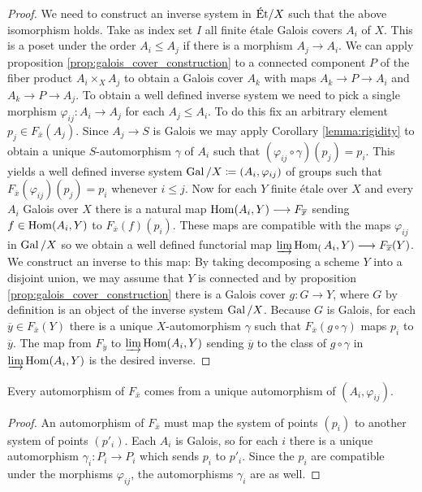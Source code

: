 \begin{proof}
	We need to construct an inverse system in $\text{\'Et}/X$ such that the above isomorphism holds. Take as index set $I$ all finite \'etale Galois covers $A_i$ of $X$. This is a poset under the order $A_i \le A_j$ if there is a morphism $A_j \to A_i$. We can apply proposition \ref{prop:galois_cover_construction} to a connected component $P$ of the fiber product $A_i \times_X A_j$ to obtain a Galois cover $A_k$ with maps $A_k \to P \to A_i$ and $A_k \to P \to A_j$. To obtain a well defined inverse system we need to pick a single morphism $\varphi_{ij} \colon A_i \to A_j$ for each $A_j \le A_i$. To do this fix an arbitrary element $p_j \in F_{\overline{x}}(A_j)$. Since $A_j \to S$ is Galois we may apply Corollary \ref{lemma:rigidity} to obtain a unique $S$-automorphism $\gamma$ of $A_i$ such that $(\varphi_{ij} \circ \gamma) (p_j) = p_i$. This yields a well defined inverse system $\operatorname{Gal}/X \coloneqq (A_i, \varphi_{ij})$ of groups such that $F_{\overline{x}}(\varphi_{ij})(p_j) = p_i$ whenever $i \le j$. Now for each $Y$ finite \'etale over $X$ and every $A_i$ Galois over $X$ there is a natural map $\operatorname{Hom}(A_i, Y) \longrightarrow F_{\overline{x}}$ sending $f \in \operatorname{Hom}(A_i,Y)$ to $F_{\overline{x}}(f)(p_i)$. These maps are compatible with the maps $\varphi_{ij}$ in $\operatorname{Gal}/X$ so we obtain a well defined functorial map $\varinjlim \operatorname{Hom}_(A_i, Y) \longrightarrow F_{\overline{x}}(Y)$. We construct an inverse to this map: By taking decomposing a scheme $Y$ into a disjoint union, we may assume that $Y$ is connected and by proposition \ref{prop:galois_cover_construction} there is a Galois cover $g: G \to Y$, where $G$ by definition is an object of the inverse system $\operatorname{Gal}/X$. Because $G$ is Galois, for each $\overline{y} \in F_{\overline{x}}(Y)$ there is a unique $X$-automorphism $\gamma$ such that $F_{\overline{x}}(g \circ \gamma)$ maps $p_i$ to $\overline{y}$. The map from $F_{\overline{y}}$ to $\varinjlim \operatorname{Hom}(A_i, Y)$ sending $\overline{y}$ to the class of $g \circ \gamma$ in $\varinjlim\operatorname{Hom}(A_i,Y)$ is the desired inverse.
\end{proof}

\begin{corollary}
	Every automorphism of $F_{\overline{x}}$ comes from a unique automorphism of $(A_i, \varphi_{ij})$.
\end{corollary}

\begin{proof}
	An automorphism of $F_{\overline{x}}$ must map the system of points $(p_i)$ to another system of points $(p'_i)$. Each $A_i$ is Galois, so for each $i$ there is a unique automorphism $\gamma_i \colon P_i \to P_i$ which sends $p_i$ to $p'_i$. Since the $p_i$ are compatible under the morphisms $\varphi_{ij}$, the automorphisms $\gamma_i$ are as well.
\end{proof}


